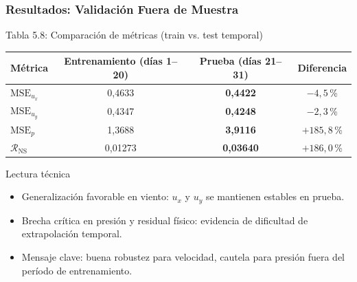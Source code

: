 \begin{frame}[fragile,shrink=8]
  \frametitle{Resultados: Validación Fuera de Muestra}

  \begin{block}{Tabla 5.8: Comparación de métricas (train vs. test temporal)}
    \scriptsize
    \centering
    \begin{tabular}{lccc}
      \hline
      Métrica & Entrenamiento (días 1--20) & Prueba (días 21--31) & Diferencia \\
      \hline
      $\text{MSE}_{u_x}$ & 0{,}4633 & \textbf{0{,}4422} & $-4{,}5$\,\% \\
      $\text{MSE}_{u_y}$ & 0{,}4347 & \textbf{0{,}4248} & $-2{,}3$\,\% \\
      $\text{MSE}_{p}$   & 1{,}3688 & \textbf{3{,}9116} & $+185{,}8$\,\% \\
      $\mathcal{R}_{\text{NS}}$ & 0{,}01273 & \textbf{0{,}03640} & $+186{,}0$\,\% \\
      \hline
    \end{tabular}
  \end{block}

  \begin{block}{Lectura técnica}
    \begin{itemize}
      \small
      \item Generalización favorable en viento: $u_x$ y $u_y$ se mantienen estables en prueba.
      \item Brecha crítica en presión y residual físico: evidencia de dificultad de extrapolación temporal.
      \item Mensaje clave: buena robustez para velocidad, cautela para presión fuera del período de entrenamiento.
    \end{itemize}
  \end{block}

\end{frame}

